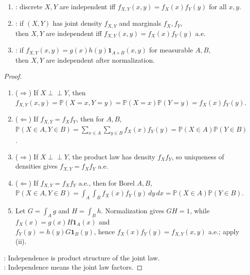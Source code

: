 \begin{proposition} \label{prop:factorization-tests-for-random-variable-independence} 
\begin{enumerate}[label=(\roman*)]
\setlength{\itemsep}{0pt}
\item {}: discrete $X,Y$ are independent iff $f_{X,Y}(x,y)=f_X(x)f_Y(y)$ for all $x,y$.
\item {}: if $(X,Y)$ has joint density $f_{X,Y}$ and marginals $f_X,f_Y$,\\
then $X,Y$ are independent iff $f_{X,Y}(x,y)=f_X(x)f_Y(y)$ a.e.
\item {}: if $f_{X,Y}(x,y)=g(x)h(y)\mathbf{1}_{A\times B}(x,y)$ for measurable $A,B$,\\
then $X,Y$ are independent after normalization.
\end{enumerate}
\begin{proof}
\begin{enumerate}[label=(\roman*)]
\setlength{\itemsep}{0pt}
\item[$(i)$] ($\Rightarrow$) If $X\perp\!\!\!\perp Y$, then $f_{X,Y}(x,y)=\mathbb{P}(X=x,Y=y)=\mathbb{P}(X=x)\mathbb{P}(Y=y)=f_X(x)f_Y(y)$.
\item[$(i)$] ($\Leftarrow$) If $f_{X,Y}=f_Xf_Y$, then for $A,B$, $\mathbb{P}(X\in A,Y\in B)=\sum\limits_{x\in A}\sum\limits_{y\in B}f_X(x)f_Y(y)=\mathbb{P}(X\in A)\mathbb{P}(Y\in B)$.
\item[$(ii)$] ($\Rightarrow$) If $X\perp\!\!\!\perp Y$, the product law has density $f_Xf_Y$, so uniqueness of densities gives $f_{X,Y}=f_Xf_Y$ a.e.
\item[$(ii)$] ($\Leftarrow$) If $f_{X,Y}=f_Xf_Y$ a.e., then for Borel $A,B$,\\
$\mathbb{P}(X\in A,Y\in B)=\int_A\int_Bf_X(x)f_Y(y)\,dy\,dx=\mathbb{P}(X\in A)\mathbb{P}(Y\in B)$.
\item[$(iii)$] Let $G=\int_Ag$ and $H=\int_Bh$. Normalization gives $GH=1$, while $f_X(x)=g(x)H\mathbf{1}_A(x)$ and\\
$f_Y(y)=h(y)G\mathbf{1}_B(y)$, hence $f_X(x)f_Y(y)=f_{X,Y}(x,y)$ a.e.; apply (ii).
\end{enumerate}
: Independence is product structure of the joint law.\\
: Independence means the joint law factors.
\end{proof}
\end{proposition}

